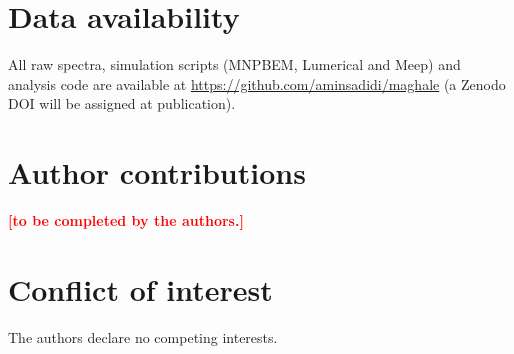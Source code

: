 \documentclass[11pt,a4paper]{article}
\newcommand{\TBD}[1]{\textcolor{red}{\textbf{[#1]}}}
\begin{document}
\section*{Data availability}
All raw spectra, simulation scripts (MNPBEM, Lumerical and Meep) and analysis code are available at
\url{https://github.com/aminsadidi/maghale} (a Zenodo DOI will be assigned at publication).

\section*{Author contributions}
\TBD{to be completed by the authors.}

\section*{Conflict of interest}
The authors declare no competing interests.


\end{document}

